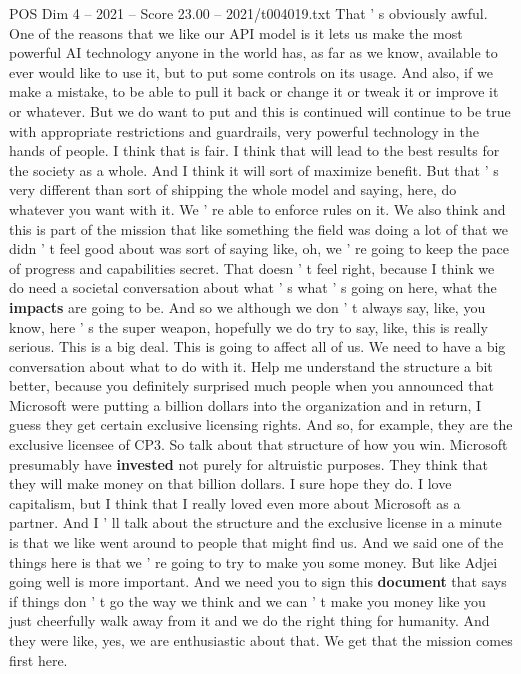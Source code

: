 \begin{textsample}{POS Dim 4 – 2021 – Score 23.00 – 2021/t004019.txt}
That ' s obviously awful.
One of the reasons that we like our API model is it lets us make the most powerful AI technology anyone in the world has, as far as we know, available to ever would like to use it, but to put some controls on its usage.
And also, if we make a mistake, to be able to pull it back or change it or tweak it or improve it or whatever.
But we do want to put and this is continued will continue to be true with appropriate restrictions and guardrails, very powerful technology in the hands of people.
I think that is fair.
I think that will lead to the best results for the society as a whole.
And I think it will sort of maximize benefit.
But that ' s very different than sort of shipping the whole model and saying, here, do whatever you want with it.
We ' re able to enforce rules on it.
We also think and this is part of the mission that like something the field was doing a lot of that we didn ' t feel good about was sort of saying like, oh, we ' re going to keep the pace of progress and capabilities secret.
That doesn ' t feel right, because I think we do need a societal conversation about what ' s what ' s going on here, what the \textbf{impacts} are going to be.
And so we although we don ' t always say, like, you know, here ' s the super weapon, hopefully we do try to say, like, this is really serious.
This is a big deal.
This is going to affect all of us.
We need to have a big conversation about what to do with it.
Help me understand the structure a bit better, because you definitely surprised much people when you announced that Microsoft were putting a billion dollars into the organization and in return, I guess they get certain exclusive licensing rights.
And so, for example, they are the exclusive licensee of CP3.
So talk about that structure of how you win.
Microsoft presumably have \textbf{invested} not purely for altruistic purposes.
They think that they will make money on that billion dollars.
I sure hope they do.
I love capitalism, but I think that I really loved even more about Microsoft as a partner.
And I ' ll talk about the structure and the exclusive license in a minute is that we like went around to people that might find us.
And we said one of the things here is that we ' re going to try to make you some money.
But like Adjei going well is more important.
And we need you to sign this \textbf{document} that says if things don ' t go the way we think and we can ' t make you money like you just cheerfully walk away from it and we do the right thing for humanity.
And they were like, yes, we are enthusiastic about that.
We get that the mission comes first here.

\end{textsample}
